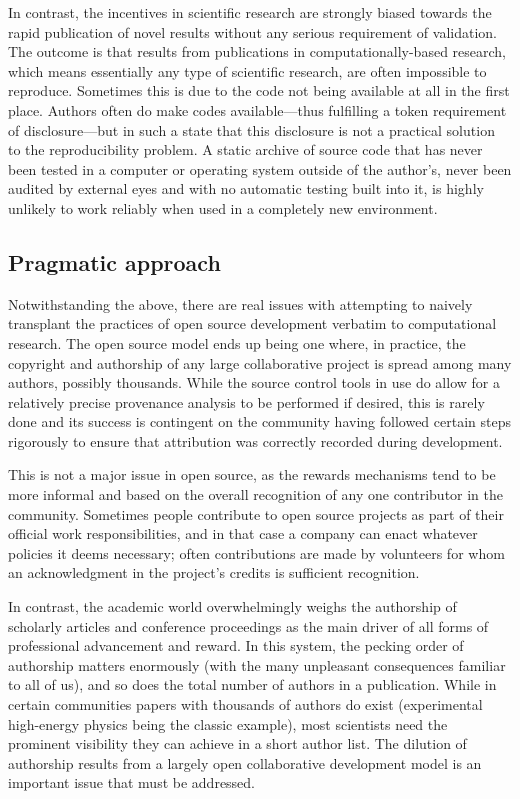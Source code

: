 \documentclass[ChapterTOCs,krantz2]{krantz} %
\begin{document}
In contrast, the incentives in scientific research are strongly
biased towards the rapid publication of novel results without any serious
requirement of validation. The outcome is that results from publications
in computationally-based research, which means essentially any type of
scientific research, are often impossible to reproduce. Sometimes
this is due to the code not being available at all in the first place.
Authors often do make codes available---thus fulfilling a token requirement
of disclosure---but in such a state that this disclosure is not a
practical solution to the reproducibility problem. A static archive
of source code that has never been tested in a computer or operating
system outside of the author's, never been audited by external eyes
and with no automatic testing built into it, is highly unlikely to
work reliably when used in a completely new environment.

\subsection{Pragmatic approach}

Notwithstanding the above, there are real issues with attempting to
naively transplant the practices of open source development verbatim
to computational research. The open source model ends up being one
where, in practice, the copyright and authorship of any large collaborative
project is spread among many authors, possibly thousands. While
the source control tools in use do allow for a relatively precise
provenance analysis to be performed if desired, this is rarely done
and its success is contingent on the community having followed certain
steps rigorously to ensure that attribution was correctly recorded
during development.

This is not a major issue in open source, as the rewards mechanisms
tend to be more informal and based on the overall recognition of any
one contributor in the community. Sometimes people contribute to open
source projects as part of their official work responsibilities, and
in that case a company can enact whatever policies it deems necessary;
often contributions are made by volunteers for whom an acknowledgment
in the project's credits is sufficient recognition.

In contrast, the academic world overwhelmingly weighs the authorship
of scholarly articles and conference proceedings as the main driver
of all forms of professional advancement and reward. In this system,
the pecking order of authorship matters enormously (with the many
unpleasant consequences familiar to all of us), and so does the total
number of authors in a publication. While in certain communities papers
with thousands of authors do exist (experimental high-energy physics
being the classic example), most scientists need the prominent visibility
they can achieve in a short author list. The dilution of authorship
results from a largely open collaborative development model
is an important issue that must be addressed.
\end{document}
